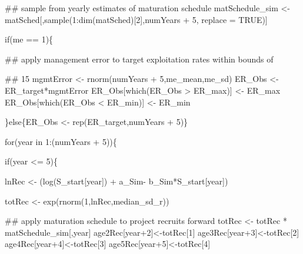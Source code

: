 \documentclass[
  11pt,
]{article}
\newenvironment{Shaded}{}{}
\newcommand{\CommentTok}[1]{\textcolor[rgb]{0.00,0.50,0.00}{#1}}
\newcommand{\ControlFlowTok}[1]{\textcolor[rgb]{0.00,0.00,1.00}{#1}}
\newcommand{\DataTypeTok}[1]{#1}
\newcommand{\DecValTok}[1]{#1}
\newcommand{\KeywordTok}[1]{\textcolor[rgb]{0.00,0.00,1.00}{#1}}
\newcommand{\NormalTok}[1]{#1}
\newcommand{\OperatorTok}[1]{#1}
\newcommand{\OtherTok}[1]{\textcolor[rgb]{1.00,0.25,0.00}{#1}}
\newcommand{\StringTok}[1]{\textcolor[rgb]{0.00,0.50,0.50}{#1}}
\begin{document}
\begin{Shaded}
\begin{Highlighting}[]
        \CommentTok{## sample from yearly estimates of maturation schedule}
\NormalTok{        matSchedule_sim <-}\StringTok{ }\NormalTok{matSched[,}\KeywordTok{sample}\NormalTok{(}\DecValTok{1}\OperatorTok{:}\KeywordTok{dim}\NormalTok{(matSched)[}\DecValTok{2}\NormalTok{],numYears }\OperatorTok{+}\StringTok{ }\DecValTok{5}\NormalTok{, }\DataTypeTok{replace =} \OtherTok{TRUE}\NormalTok{)]}
        
        \ControlFlowTok{if}\NormalTok{(me }\OperatorTok{==}\StringTok{ }\DecValTok{1}\NormalTok{)\{}
          
          \CommentTok{## apply management error to target exploitation rates within bounds of}
          \CommentTok{## 15%
\NormalTok{          mgmtError <-}\StringTok{ }\KeywordTok{rnorm}\NormalTok{(numYears }\OperatorTok{+}\StringTok{ }\DecValTok{5}\NormalTok{,me_mean,me_sd)}
\NormalTok{          ER_Obs <-}\StringTok{ }\NormalTok{ER_target}\OperatorTok{*}\NormalTok{mgmtError}
\NormalTok{          ER_Obs[}\KeywordTok{which}\NormalTok{(ER_Obs }\OperatorTok{>}\StringTok{ }\NormalTok{ER_max)] <-}\StringTok{ }\NormalTok{ER_max}
\NormalTok{          ER_Obs[}\KeywordTok{which}\NormalTok{(ER_Obs }\OperatorTok{<}\StringTok{ }\NormalTok{ER_min)] <-}\StringTok{ }\NormalTok{ER_min}
            
\NormalTok{        \}}\ControlFlowTok{else}\NormalTok{\{ER_Obs <-}\StringTok{ }\KeywordTok{rep}\NormalTok{(ER_target,numYears }\OperatorTok{+}\StringTok{ }\DecValTok{5}\NormalTok{)\}}
        
        
        \ControlFlowTok{for}\NormalTok{(year }\ControlFlowTok{in} \DecValTok{1}\OperatorTok{:}\NormalTok{(numYears }\OperatorTok{+}\StringTok{ }\DecValTok{5}\NormalTok{))\{}
          
          \ControlFlowTok{if}\NormalTok{(year }\OperatorTok{<=}\StringTok{ }\DecValTok{5}\NormalTok{)\{}
            
\NormalTok{            lnRec <-}\StringTok{ }\NormalTok{(}\KeywordTok{log}\NormalTok{(S_start[year]) }\OperatorTok{+}\StringTok{ }\NormalTok{a_Sim}\OperatorTok{-}\StringTok{ }\NormalTok{b_Sim}\OperatorTok{*}\NormalTok{S_start[year])}
            
\NormalTok{            totRec <-}\StringTok{ }\KeywordTok{exp}\NormalTok{(}\KeywordTok{rnorm}\NormalTok{(}\DecValTok{1}\NormalTok{,lnRec,median_sd_r))}
            
            \CommentTok{## apply maturation schedule to project recruits forward}
\NormalTok{            totRec <-}\StringTok{ }\NormalTok{totRec }\OperatorTok{*}\StringTok{ }\NormalTok{matSchedule_sim[,year]}
\NormalTok{            age2Rec[year}\OperatorTok{+}\DecValTok{2}\NormalTok{]<-totRec[}\DecValTok{1}\NormalTok{]}
\NormalTok{            age3Rec[year}\OperatorTok{+}\DecValTok{3}\NormalTok{]<-totRec[}\DecValTok{2}\NormalTok{]}
\NormalTok{            age4Rec[year}\OperatorTok{+}\DecValTok{4}\NormalTok{]<-totRec[}\DecValTok{3}\NormalTok{]}
\NormalTok{            age5Rec[year}\OperatorTok{+}\DecValTok{5}\NormalTok{]<-totRec[}\DecValTok{4}\NormalTok{]}
            
}
\end{Highlighting}
\end{Shaded}
\end{document}
